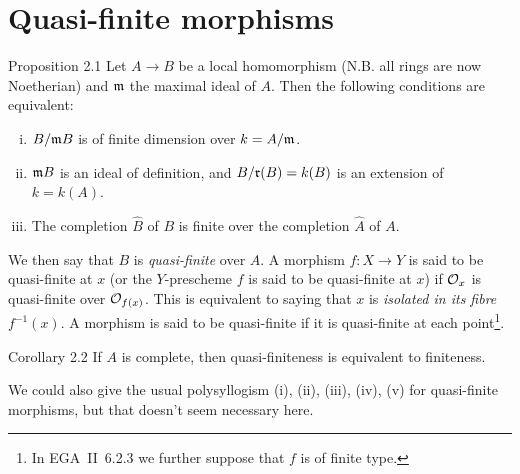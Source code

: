 \section{Quasi-finite morphisms}
\label{I.2}

\begin{itenv}{Proposition 2.1}
\label{I.2.1}
  Let $A\to B$ be a local homomorphism (N.B. all rings are now Noetherian) and $\frak{m}$ the maximal ideal of $A$.
  Then the following conditions are equivalent:
  \begin{enumerate}[(i)]
    \item $B/\frak{m}B$ is of finite dimension over $k=A/\frak{m}$.
    \item $\frak{m}B$ is an ideal of definition, and $B/\frak{r}(B)=k(B)$ is an extension of $k=k(A)$.
    \item The completion $\hat{B}$ of $B$ is finite over the completion $\hat{A}$ of $A$.
  \end{enumerate}
\end{itenv}

We then say that $B$ is \emph{quasi-finite} over $A$.
A morphism $f\colon X\to Y$ is said to be quasi-finite at $x$ (or the $Y$-prescheme $f$ is said to be quasi-finite at $x$) if $\cal{O}_x$ is quasi-finite over $\cal{O}_{f(x)}$.
This is equivalent to saying that $x$ is \emph{isolated in its fibre $f^{-1}(x)$}.
A morphism is said to be quasi-finite if it is quasi-finite at each point\footnote{In EGA~II~6.2.3 we further suppose that $f$ is of finite type.}.

\begin{itenv}{Corollary 2.2}
\label{I.2.2}
  If $A$ is complete, then quasi-finiteness is equivalent to finiteness.
\end{itenv}

We could also give the usual polysyllogism (i), (ii), (iii), (iv), (v) for quasi-finite morphisms, but that doesn't seem necessary here.
